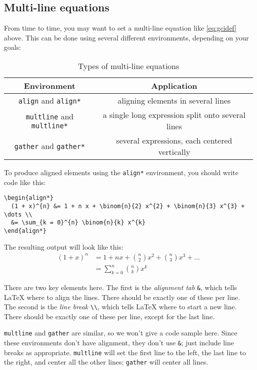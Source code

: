 \documentclass{article}
\newcommand*{\code}[1]{\texttt{#1}}
\begin{document}
\subsection{Multi-line equations}
From time to time, you may want to set a multi-line equation like \cref{eq:gcidef} above.
This can be done using several different environments, depending on your goals:
\begin{table}[htb]
  \centering
  \begin{tabular}{c c}
    \toprule
    Environment & Application \\ \midrule
    \code{align} and \code{align*} & aligning elements in several lines \\
    \code{multline} and \code{multline*} & a single long expression split onto several lines \\
    \code{gather} and \code{gather*} & several expressions, each centered vertically \\
    \bottomrule
  \end{tabular}
  \caption{Types of multi-line equations}
  \label{tab:multiline}
\end{table}

To produce aligned elements using the \code{align*} environment, you should write code like this:
\begin{verbatim}
\begin{align*}
  (1 + x)^{n} &= 1 + n x + \binom{n}{2} x^{2} + \binom{n}{3} x^{3} + \dots \\
  &= \sum_{k = 0}^{n} \binom{n}{k} x^{k}
\end{align*}
\end{verbatim}
The resulting output will look like this:
\begin{align}
  (1 + x)^{n} &= 1 + n x + \binom{n}{2} x^{2} + \binom{n}{3} x^{3} + \dots \\ \nonumber
  &= \sum_{k = 0}^{n} \binom{n}{k} x^{k} \label{eq:binom}
\end{align}

There are two key elements here.
The first is the \emph{alignment tab} \code{\&}, which tells \LaTeX{} where to align the lines.
There should be exactly one of these per line.
The second is the \emph{line break} \code{\textbackslash{}\textbackslash{}}, which tells \LaTeX{} where to start a new line.
There should be exactly one of these per line, except for the last line.

\code{multline} and \code{gather} are similar, so we won't give a code sample here.
Since these environments don't have alignment, they don't use \code{\&}; just include line breaks as appropriate.
\code{multline} will set the first line to the left, the last line to the right, and center all the other lines; \code{gather} will center all lines.
\end{document}
